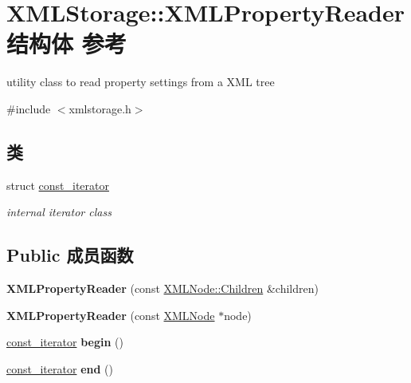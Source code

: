 \hypertarget{struct_x_m_l_storage_1_1_x_m_l_property_reader}{}\section{X\+M\+L\+Storage\+:\+:X\+M\+L\+Property\+Reader结构体 参考}
\label{struct_x_m_l_storage_1_1_x_m_l_property_reader}


utility class to read property settings from a X\+ML tree  




{\ttfamily \#include $<$xmlstorage.\+h$>$}

\subsection*{类}
\begin{DoxyCompactItemize}
\item 
struct \hyperlink{struct_x_m_l_storage_1_1_x_m_l_property_reader_1_1const__iterator}{const\+\_\+iterator}
\begin{DoxyCompactList}\small\item\em internal iterator class \end{DoxyCompactList}\end{DoxyCompactItemize}
\subsection*{Public 成员函数}
\begin{DoxyCompactItemize}
\item 
\mbox{\label{struct_x_m_l_storage_1_1_x_m_l_property_reader_a9410a1b9884791fbee5cbb5bbe0ef42c}} 
{\bfseries X\+M\+L\+Property\+Reader} (const \hyperlink{struct_x_m_l_storage_1_1_x_m_l_node_1_1_children}{X\+M\+L\+Node\+::\+Children} \&children)
\item 
\mbox{\label{struct_x_m_l_storage_1_1_x_m_l_property_reader_ae571cb1dbee0e0857e87946af6cdac1f}} 
{\bfseries X\+M\+L\+Property\+Reader} (const \hyperlink{struct_x_m_l_storage_1_1_x_m_l_node}{X\+M\+L\+Node} $\ast$node)
\item 
\mbox{\label{struct_x_m_l_storage_1_1_x_m_l_property_reader_a2a56a04a2a479775b1208f485ecf7e7c}} 
\hyperlink{struct_x_m_l_storage_1_1_x_m_l_property_reader_1_1const__iterator}{const\+\_\+iterator} {\bfseries begin} ()
\item 
\mbox{\label{struct_x_m_l_storage_1_1_x_m_l_property_reader_a6aaeee4b291ae50ebb564f5b6cc9aace}} 
\hyperlink{struct_x_m_l_storage_1_1_x_m_l_property_reader_1_1const__iterator}{const\+\_\+iterator} {\bfseries end} ()
\end{DoxyCompactItemize}

